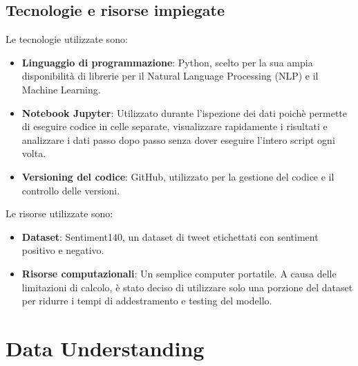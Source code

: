 \documentclass[12pt,a4paper]{report} %
\begin{document}
\section{Tecnologie e risorse impiegate}
Le tecnologie utilizzate sono:
\begin{itemize}
\item \textbf{Linguaggio di programmazione}: Python, scelto per la sua ampia disponibilità di librerie per il Natural Language Processing (NLP) e il Machine Learning.
\item \textbf{Notebook Jupyter}: Utilizzato durante l'ispezione dei dati poichè permette di eseguire codice in celle separate, visualizzare rapidamente i risultati e analizzare i dati passo dopo passo senza dover eseguire l'intero script ogni volta. 
\item \textbf{Versioning del codice}: GitHub, utilizzato per la gestione del codice e il controllo delle versioni.
\end{itemize}
Le risorse utilizzate sono:
\begin{itemize}
\item \textbf{Dataset}: Sentiment140, un dataset di tweet etichettati con sentiment positivo e negativo.
\item \textbf{Risorse computazionali}: Un semplice computer portatile. A causa delle limitazioni di calcolo, è stato deciso di utilizzare solo una porzione del dataset per ridurre i tempi di addestramento e testing del modello.
\end{itemize}


\chapter{Data Understanding}
\end{document}
